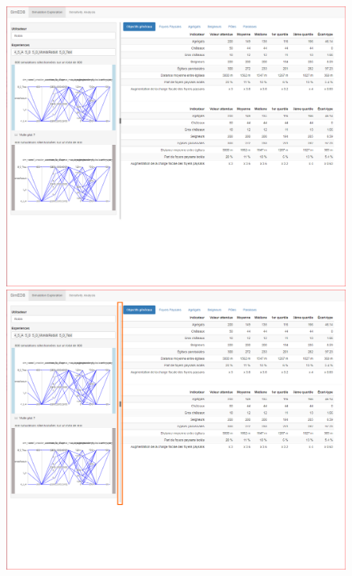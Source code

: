\begin{figure}[H]
\hspace*{\fill}%
\begin{minipage}[t]{.49\linewidth}
\centering
\vspace{0pt}
\includegraphics[width=\linewidth]{img/SimEDB_base.png}
\end{minipage} \hfill
\begin{minipage}[t]{.49\linewidth}
\centering
\vspace{0pt}
\includegraphics[width=\linewidth]{img/SimEDB_resize.png}

\end{minipage}
\end{figure}
